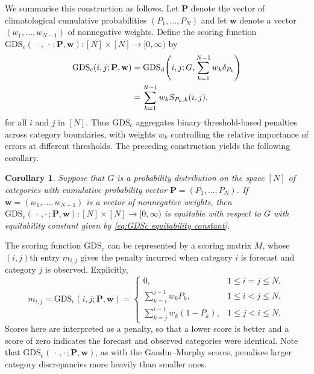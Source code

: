 \documentclass[10pt]{article} %
\theoremstyle{theorem}
\newtheorem{cor}{Corollary}
\theoremstyle{definition}
\newcommand{\boldw}{\mathbf{w}}
\newcommand{\boldP}{\mathbf{P}}
\newcommand{\GDSd}{\mathrm{GDS}_\mathrm{d}}
\newcommand{\GDSc}{\mathrm{GDS}_\mathrm{c}}
\newcommand{\twocdots}{\,\cdot\,,\cdot\,}
\begin{document}
We summarise this construction as follows. Let $\boldP$ denote the vector of climatological cumulative probabilities $(P_1,\ldots,P_N)$ and let $\boldw$ denote a vector $(w_1,\ldots,w_{N-1})$ of nonnegative weights. Define the scoring function $\GDSc(\,\cdot\,,\,\cdot\,;\boldP,\boldw):[N]\times[N] \to [0,\infty)$ by
\begin{align}
\GDSc(i,j; \boldP, \boldw)
&= \GDSd\!\left(i,j;G,\sum_{k=1}^{N-1} w_k \delta_{P_k}\right) \notag \\
&= \sum_{k=1}^{N-1} w_k S_{P_k,k}(i,j),
\label{eq:GDSc}
\end{align}
for all $i$ and $j$ in $[N]$. Thus $\GDSc$ aggregates binary threshold-based penalties across category boundaries, with weights $w_k$ controlling the relative importance of errors at different thresholds. The preceding construction yields the following corollary.


\begin{cor}\label{cor:GDSc}
Suppose that $G$ is a probability distribution on the space $[N]$ of categories with cumulative probability vector $\boldP=(P_1,\ldots,P_N)$. If $\boldw=(w_1,\ldots,w_{N-1})$ is a vector of nonnegative weights, then $\GDSc(\twocdots; \boldP, \boldw):[N]\times[N]\to[0,\infty)$ is equitable with respect to $G$ with equitability constant given by \eqref{eq:GDSc equitability constant}.
\end{cor}

The scoring function $\GDSc$ can be represented by a scoring matrix $M$, whose $(i,j)$th entry $m_{i,j}$ gives the penalty incurred when category $i$ is forecast and category $j$ is observed. Explicitly,
\begin{equation}\label{eq:S_c matrix entries}
m_{i,j} =\GDSc(i,j;\boldP,\boldw)=
\begin{cases}
0, & 1\leq i=j \leq N, \\
\sum_{k=i}^{j-1} w_k P_k , & 1\leq i<j \leq N, \\
\sum_{k=j}^{i-1} w_k (1-P_k) , & 1\leq j<i \leq N,
\end{cases}
\end{equation}
Scores here are interpreted as a penalty, so that a lower score is better and a score of zero indicates the forecast and observed categories were identical. Note that $\GDSc(\twocdots;\boldP,\boldw)$, as with the Gandin--Murphy scores, penalises larger category discrepancies more heavily than smaller ones.
\end{document}
